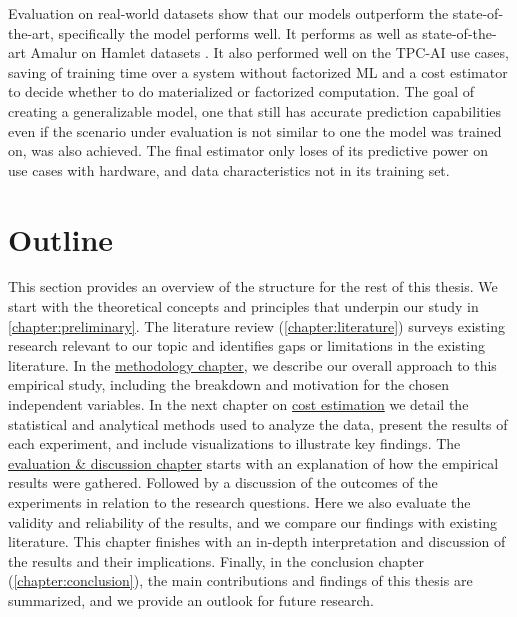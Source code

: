 Evaluation on real-world datasets show that our models outperform the state-of-the-art, specifically the  model performs well. It performs  as well as state-of-the-art Amalur \cite{schijndel_cost_estimation} on Hamlet datasets \cite{2016hamletsigmod}. It also performed well on the TPC-AI use cases, saving  of training time over a system without factorized ML and a cost estimator to decide whether to do materialized or factorized computation. The goal of creating a generalizable model, one that still has accurate prediction capabilities even if the scenario under evaluation is not similar to one the model was trained on, was also achieved. The final estimator only loses  of its predictive power on use cases with hardware, and data characteristics not in its training set.


\section{Outline}
This section provides an overview of the structure for the rest of this thesis. We start with the theoretical concepts and principles that underpin our study in \autoref{chapter:preliminary}. The literature review (\autoref{chapter:literature}) surveys existing research relevant to our topic and identifies gaps or limitations in the existing literature. In the \hyperref[chapter:methodology]{methodology chapter}, we describe our overall approach to this empirical study, including the breakdown and motivation for the chosen independent variables.  In the next chapter on \hyperref[chapter:cost-estimations]{cost estimation} we detail the statistical and analytical methods used to analyze the data, present the results of each experiment, and include visualizations to illustrate key findings. The \hyperref[chapter:evaluation-discussion]{evaluation \& discussion chapter} starts with an explanation of how the empirical results were gathered. Followed by a discussion of the outcomes of the experiments in relation to the research questions. Here we also evaluate the validity and reliability of the results, and we compare our findings with existing literature. This chapter finishes with an in-depth interpretation and discussion of the results and their implications.  Finally, in the conclusion chapter (\autoref{chapter:conclusion}), the main contributions and findings of this thesis are summarized, and we provide an outlook for future research.

